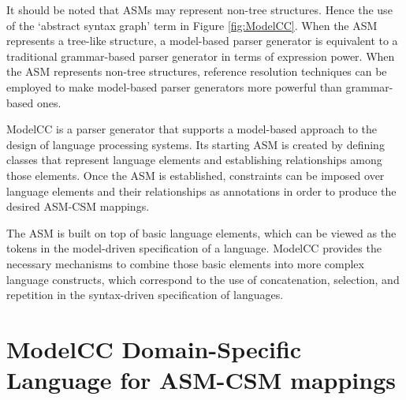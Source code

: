 \documentclass[floatfix,rmp,twocolumn,twoside]{revtex4}
\begin{document}
It should be noted that ASMs may represent non-tree structures. Hence the use of the `abstract syntax graph' term in Figure \ref{fig:ModelCC}.
When the ASM represents a tree-like structure, a model-based parser generator is equivalent to a traditional grammar-based parser generator in terms of expression power. When the ASM represents non-tree structures, reference resolution techniques can be employed to make model-based parser generators more powerful than grammar-based ones.

ModelCC \cite{Quesada2011c,Quesada2012k} is a parser generator that supports a model-based approach to the design of language processing systems.
Its starting ASM is created by defining classes that represent language elements and establishing relationships among those elements. Once the ASM is established, constraints can be imposed over language elements and their relationships as annotations in order to produce the desired ASM-CSM mappings.

The ASM is built on top of basic language elements, which can be viewed as the tokens in the model-driven specification of a language. ModelCC provides the necessary mechanisms to combine those basic elements into more complex language constructs, which correspond to the use of concatenation, selection, and repetition in the syntax-driven specification of languages.

\section{ModelCC Domain-Specific Language for ASM-CSM mappings} \label{sec:syntaxmodelconstraintspecificationlanguage}
\end{document}
